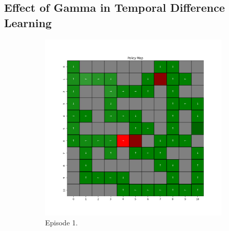\documentclass{assignment}
\begin{document}
\subsection{Effect of Gamma in Temporal Difference Learning}

\begin{figure}[H]
    \begin{subfigure}{0.3\textwidth}
        \includegraphics[width=\textwidth]{figures/policy_td/gamma_sweep/policy_alpha_0.1_gamma_0.1_epsilon_0.2_iteration_1.png}
    \caption{Episode 1.}
    \end{subfigure}\hfill
    \begin{subfigure}{0.3\textwidth}

\end{subfigure}
\end{figure}
\end{document}
